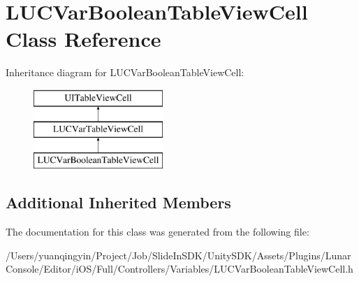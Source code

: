 \hypertarget{interface_l_u_c_var_boolean_table_view_cell}{}\section{L\+U\+C\+Var\+Boolean\+Table\+View\+Cell Class Reference}
\label{interface_l_u_c_var_boolean_table_view_cell}
Inheritance diagram for L\+U\+C\+Var\+Boolean\+Table\+View\+Cell\+:\begin{figure}[H]
\begin{center}
\leavevmode
\includegraphics[height=3.000000cm]{interface_l_u_c_var_boolean_table_view_cell}
\end{center}
\end{figure}
\subsection*{Additional Inherited Members}


The documentation for this class was generated from the following file\+:\begin{DoxyCompactItemize}
\item 
/\+Users/yuanqingyin/\+Project/\+Job/\+Slide\+In\+S\+D\+K/\+Unity\+S\+D\+K/\+Assets/\+Plugins/\+Lunar\+Console/\+Editor/i\+O\+S/\+Full/\+Controllers/\+Variables/L\+U\+C\+Var\+Boolean\+Table\+View\+Cell.\+h\end{DoxyCompactItemize}
